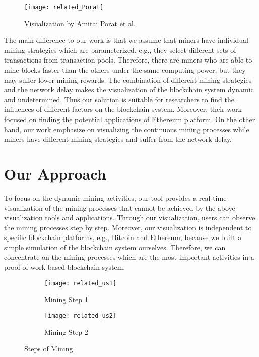 \begin{figure}[htb]
    \centering
    \texttt{[image: related\_Porat]}
    \caption{Visualization by Amitai Porat et al.}
    \label{fig:visualization by amitai porat et al}
\end{figure}

The main difference to our work is that we assume that miners have individual mining strategies which are parameterized, e.g., they select different sets of transactions from transaction pools. Therefore, there are miners who are able to mine blocks faster than the others under the same computing power, but they may suffer lower mining rewards. The combination of different mining strategies and the network delay makes the visualization of the blockchain system dynamic and undetermined. Thus our solution is suitable for researchers to find the influences of different factors on the blockchain system. Moreover, their work focused on finding the potential applications of Ethereum platform. On the other hand, our work emphasize on visualizing the continuous mining processes while miners have different mining strategies and suffer from the network delay. 

\section{Our Approach}

To focus on the dynamic mining activities, our tool provides a real-time visualization of the mining processes that cannot be achieved by the above visualization tools and applications. Through our visualization, users can observe the mining processes step by step. Moreover, our visualization is independent to specific blockchain platforms, e.g., Bitcoin and Ethereum, because we built a simple simulation of the blockchain system ourselves. Therefore, we can concentrate on the mining processes which are the most important activities in a proof-of-work based blockchain system.

\begin{figure}[htb]
    \centering
    \begin{subfigure}[b]{1\textwidth}
        \centering
        \texttt{[image: related\_us1]}
        \caption{Mining Step 1}
    \end{subfigure}

    \begin{subfigure}[b]{1\textwidth}
        \centering
        \texttt{[image: related\_us2]}
        \caption{Mining Step 2}
    \end{subfigure}

    \caption{Steps of Mining.}
    \label{fig:steps of mining}
\end{figure}

